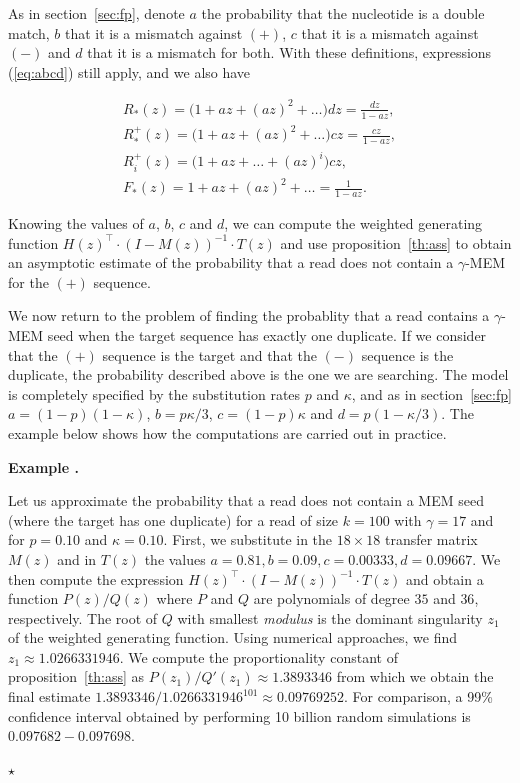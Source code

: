 \documentclass{article}
\newcounter{examplecounter}
\newenvironment{example}
{\small\vspace{0.5\baselineskip}
  \refstepcounter{examplecounter}%
  \noindent\textbf{Example \arabic{examplecounter}.}%
}{\vspace{-0.2\baselineskip}\begin{center}%
  $\star$\end{center}\vspace{0.5\baselineskip}}
\begin{document}
As in section~\ref{sec:fp}, denote $a$ the probability that the nucleotide
is a double match, $b$ that it is a mismatch against $(+)$, $c$ that it is
a mismatch against $(-)$ and $d$ that it is a mismatch for both. With
these definitions, expressions (\ref{eq:abcd}) still apply, and we also
have

\begin{equation*}
\begin{gathered}
R_*(z) = \big(1 + az + (az)^2 + \ldots \big)dz = \frac{dz}{1-az}, \\
R_*^+(z) = \big(1 + az + (az)^2 + \ldots \big)cz = \frac{cz}{1-az}, \\
R_i^+(z) = \big(1 + az + \ldots  + (az)^i\big)cz, \\
F_*(z) = 1 + az + (az)^2 + \ldots = \frac{1}{1-az}.
\end{gathered}
\end{equation*}


Knowing the values of $a$, $b$, $c$ and $d$, we can compute the weighted
generating function $H(z)^\top \cdot (I-M(z))^{-1} \cdot T(z)$ and use
proposition~\ref{th:ass} to obtain an asymptotic estimate of the
probability that a read does not contain a $\gamma$-MEM for the $(+)$
sequence.

We now return to the problem of finding the probablity that a read
contains a $\gamma$-MEM seed when the target sequence has exactly one
duplicate. If we consider that the $(+)$ sequence is the target and that
the $(-)$ sequence is the duplicate, the probability described above is
the one we are searching. The model is completely specified by the
substitution rates $p$ and $\kappa$, and as in section~\ref{sec:fp} $a =
(1-p)(1-\kappa)$, $b = p\kappa/3$, $c = (1-p)\kappa$ and $d =
p(1-\kappa/3)$. The example below shows how the computations are carried
out in practice.



\begin{example}
\label{ex:num6}
Let us approximate the probability that a read does not contain a MEM seed
(where the target has one duplicate) for a read of size $k=100$ with
$\gamma=17$ and for $p=0.10$ and $\kappa=0.10$. First, we substitute in
the $18 \times 18$ transfer matrix $M(z)$ and in $T(z)$ the values
$a=0.81, b=0.09, c=0.00333, d=0.09667$. We then compute the expression
$H(z)^\top \cdot (I-M(z))^{-1} \cdot T(z)$ and obtain a function
$P(z)/Q(z)$ where $P$ and $Q$ are polynomials of degree $35$ and $36$,
respectively. The root of $Q$ with smallest \textit{modulus} is the
dominant singularity $z_1$ of the weighted generating function. Using
numerical approaches, we find $z_1 \approx 1.0266331946$. We compute the
proportionality constant of proposition~\ref{th:ass} as $P(z_1)/Q'(z_1)
\approx 1.3893346$ from which we obtain the final estimate
$1.3893346/1.0266331946^{101} \approx 0.09769252$. For comparison, a 99\%
confidence interval obtained by performing 10 billion random simulations
is $0.097682-0.097698$.
\end{example}
\end{document}

